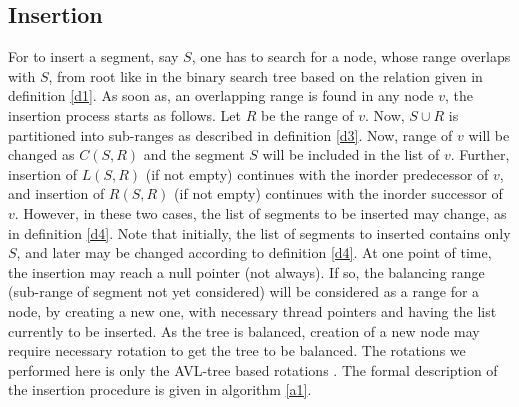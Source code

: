 \documentclass{article}
\begin{document}
\subsection{Insertion}
For to insert a segment, say $S$, one has to search for a node, whose range overlaps with $S$, from root like in the binary search tree based on the relation given in definition \ref{d1}. As soon as, an overlapping range is found in any node $v$, the insertion process starts as follows. Let $R$ be the range of $v$. Now, $S \cup R$ is partitioned into sub-ranges as described in definition \ref{d3}. Now, range of $v$ will be changed as $C(S,R)$ and the segment $S$ will be included in the list of $v$. Further, insertion of $L(S,R)$ (if not empty) continues with the inorder predecessor of $v$, and insertion of $R(S,R)$ (if not empty) continues with the inorder successor of $v$. However, in these two cases, the list of segments to be inserted may change, as in definition \ref{d4}. Note that initially, the list of segments to inserted contains only $S$, and later may be changed according to definition \ref{d4}. At one point of time, the insertion may reach a null pointer (not always). If so, the balancing range (sub-range of segment not yet considered) will be considered as a range for a node, by creating a new one, with necessary thread pointers and having the list currently to be inserted. As the tree is balanced, creation of a new node may require necessary rotation to get the tree to be balanced. The rotations we performed here is only the AVL-tree based rotations \cite{avl}. The formal description of the insertion procedure is given in algorithm \ref{a1}.
\end{document}
